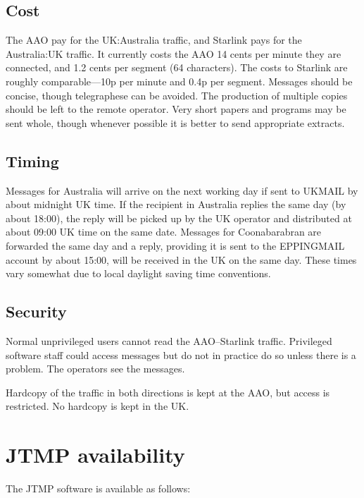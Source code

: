 \subsection{Cost}
The AAO pay for the UK:Australia traffic, and Starlink pays for the
Australia:UK traffic.
It currently costs the AAO 14 cents per minute they are connected, and
1.2 cents per segment (64 characters).
The costs to Starlink are roughly comparable---10p per minute and 0.4p per
segment.
Messages should be concise, though telegraphese can be avoided.
The production of multiple copies should be left to the remote operator.
Very short papers and programs may be sent whole, though whenever possible it is
better to send appropriate extracts.
\subsection{Timing}
Messages for Australia will arrive on the next working day if sent to UKMAIL by
about midnight UK time.
If the recipient in Australia replies the same day (by about 18:00), the reply
will be picked up by the UK operator and distributed at about 09:00 UK time on
the same date.
Messages for Coonabarabran are forwarded the same day and a reply, providing it
is sent to the EPPINGMAIL account by about 15:00, will be received in the UK on
the same day.
These times vary somewhat due to local daylight saving time conventions.
\subsection{Security}
Normal unprivileged users cannot read the AAO--Starlink traffic.
Privileged software staff could access messages but do not in practice do so
unless there is a problem.
The operators see the messages.

Hardcopy of the traffic in both directions is kept at the AAO, but access is
restricted.
No hardcopy is kept in the UK.

\section{JTMP availability}
\label{who-has-JTMP}

The JTMP software is available as follows:

